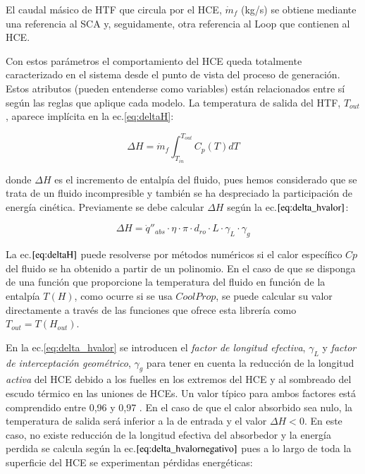 El caudal másico de HTF que circula por el HCE, $ \dot m_f $ (kg/s) se obtiene mediante una referencia al SCA y, seguidamente, otra referencia al Loop que contienen al HCE. 

Con estos parámetros el comportamiento del HCE queda totalmente caracterizado en el sistema desde el punto de vista del proceso de generación. Estos atributos (pueden entenderse como variables) están relacionados entre sí según las reglas que aplique cada modelo. La temperatura de salida del HTF, $T_{out}$, aparece implícita en la ec.\ref{eq:deltaH}:

\begin{equation}
    \Delta H =  \dot m_f  \int^{T_{out}}_{T_{in}}C_p(T) dT 
    \label{eq:deltaH}
\end{equation}

donde \(\Delta H\) es el incremento de entalpía del fluido, pues hemos considerado que se trata de un fluido incompresible y también se ha despreciado la participación de energía cinética. Previamente se debe calcular \(\Delta H\) según la ec.\(\eqref{eq:delta_hvalor}\):

\begin{equation}
   \Delta H =  \dot q''_{abs} \cdot \eta \cdot \pi \cdot d_{ro} \cdot L \cdot \gamma_L \cdot \gamma_g
    \label{eq:delta_hvalor}
\end{equation}

La ec.\(\eqref{eq:deltaH}\) puede resolverse por métodos numéricos si el calor específico \(Cp\) del fluido se ha obtenido a partir de un polinomio. En el caso de que se disponga de una función que proporcione la temperatura del fluido en función de la entalpía \(T(H)\), como ocurre si se usa \(CoolProp\), se puede calcular su valor directamente a través de las funciones que ofrece esta librería como \(T_{out} = T(H_{out})\).

En la ec.\ref{eq:delta_hvalor} se introducen el \textit{factor de longitud efectiva}, \(\gamma_L\) y \textit{factor de interceptación geométrico}, \(\gamma_g\) para tener en cuenta la reducción de la longitud \textit{activa} del HCE debido a los fuelles en los extremos del HCE y al sombreado del escudo térmico en las uniones de HCEs. Un valor típico para ambos factores está comprendido entre 0,96 y 0,97 \cite{zarzaApuntesMasterConsultor2006}. En el caso de que el calor absorbido sea nulo, la temperatura de salida será inferior a la de entrada y el valor \(\Delta H < 0\). En este caso, no existe reducción de la longitud efectiva del absorbedor y la energía perdida se calcula según la ec.\(\eqref{eq:delta_hvalornegativo}\) pues a lo largo de toda la superficie del HCE se experimentan pérdidas energéticas:

